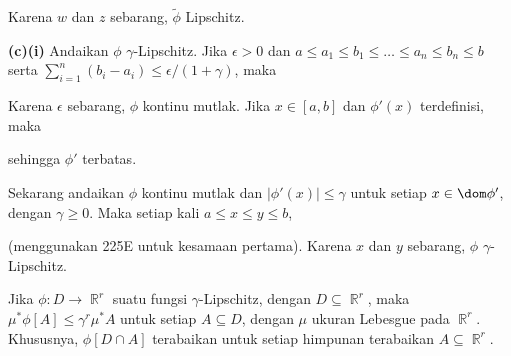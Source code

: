{\noindent Karena $w$ dan $z$ sebarang, $\tilde\phi$ Lipschitz.

\medskip

{\bf (c)(i)} Andaikan $\phi$ $\gamma$-Lipschitz.  Jika $\epsilon>0$ dan
$a\le a_1\le b_1\le\ldots\le a_n\le b_n\le b$ serta
$\sum_{i=1}^n(b_i-a_i)\le\epsilon/(1+\gamma)$, maka


\noindent Karena $\epsilon$ sebarang, $\phi$ kontinu mutlak.
Jika $x\in[a,b]$ dan $\phi'(x)$ terdefinisi, maka


\noindent sehingga $\phi'$ terbatas.

\medskip

 Sekarang andaikan $\phi$ kontinu mutlak dan
$|\phi'(x)|\le\gamma$ untuk setiap $x\in\dom\phi'$, dengan
$\gamma\ge 0$.   Maka setiap kali $a\le x\le y\le b$,


\noindent (menggunakan 225E untuk kesamaan pertama).   Karena $x$ dan $y$
sebarang, $\phi$ $\gamma$-Lipschitz.
}%


 Jika $\phi:D\to\BbbR^r$ suatu fungsi
$\gamma$-Lipschitz, dengan $D\subseteq\BbbR^r$, maka
$\mu^*\phi[A]\le\gamma^r\mu^*A$ untuk setiap $A\subseteq D$, dengan $\mu$
ukuran Lebesgue pada $\BbbR^r$.   Khususnya,
$\phi[D\cap A]$ terabaikan untuk setiap himpunan terabaikan
$A\subseteq\BbbR^r$.

